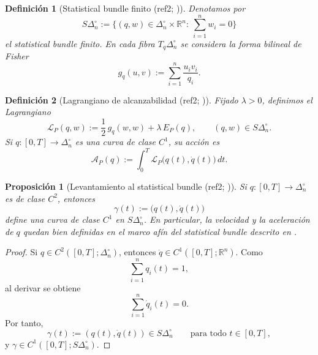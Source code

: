 ﻿\documentclass[12pt]{article}
\newcommand{\fuentecite}[2]{\textnormal{(#1; \citealp{#2})}}
\newtheorem{definicion}{Definición}[section]
\newtheorem{proposicion}{Proposición}[section]
\begin{document}
\begin{definicion}[Statistical bundle finito \fuentecite{ref2}{Pistone2018Lagrangian}]
Denotamos por
\[
S\Delta_n^\circ:=\{(q,w)\in \Delta_n^\circ\times\mathbb R^n:\ \sum_{i=1}^n w_i=0\}
\]
el statistical bundle finito. En cada fibra \(T_q\Delta_n^\circ\) se considera la forma bilineal de Fisher
\[
g_q(u,v):=\sum_{i=1}^n \frac{u_i v_i}{q_i}.
\]
\end{definicion}

\begin{definicion}[Lagrangiano de alcanzabilidad \fuentecite{ref2}{Pistone2018Lagrangian}]
Fijado \(\lambda>0\), definimos el Lagrangiano
\[
\mathcal L_P(q,w):=\frac12\,g_q(w,w)+\lambda\,E_P(q),
\qquad (q,w)\in S\Delta_n^\circ.
\]
Si \(q:[0,T]\to \Delta_n^\circ\) es una curva de clase \(C^1\), su acción es
\[
\mathcal A_P(q):=\int_0^T \mathcal L_P\bigl(q(t),\dot q(t)\bigr)\,dt.
\]
\end{definicion}

\begin{proposicion}[Levantamiento al statistical bundle \fuentecite{ref2}{Pistone2018Lagrangian}]
Si \(q:[0,T]\to\Delta_n^\circ\) es de clase \(C^2\), entonces
\[
\gamma(t):=\bigl(q(t),\dot q(t)\bigr)
\]
define una curva de clase \(C^1\) en \(S\Delta_n^\circ\). En particular, la velocidad y la aceleración de \(q\) quedan bien definidas en el marco afín del statistical bundle descrito en \cite{Pistone2018Lagrangian}.
\end{proposicion}
\begin{proof}
Si \(q\in C^2([0,T];\Delta_n^\circ)\), entonces \(\dot q\in C^1([0,T];\mathbb R^n)\). Como
\[
\sum_{i=1}^n q_i(t)=1,
\]
al derivar se obtiene
\[
\sum_{i=1}^n \dot q_i(t)=0.
\]
Por tanto,
\[
\gamma(t):=(q(t),\dot q(t))\in S\Delta_n^\circ
\qquad\text{para todo }t\in[0,T],
\]
y \(\gamma\in C^1([0,T];S\Delta_n^\circ)\).
\end{proof}
\end{document}
